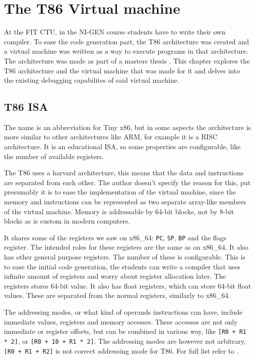 \chapter{The T86 Virtual machine}\label{section:T86}
At the FIT CTU, in the NI-GEN course students have to write their own compiler.
To ease the code generation part, the T86 architecture was created and a
virtual machine was written as a way to execute programs in that architecture.
The architecture was made as part of a masters thesis \cite{ivo2021tiny}. This
chapter explores the T86 architecture and the virtual machine that was made for
it and delves into the existing debugging capabilites of said virtual machine.

\section{T86 ISA}
The name is an abbreviation for Tiny x86, but in some aspects the architecture
is more similar to other architectures like ARM, for example it is a RISC
architecture. It is an educational ISA, so some properties are configurable,
like the number of available registers.

The T86 uses a harvard architecture, this means that the data and instructions
are separated from each other. The author doesn't specify the reason for this,
put presumably it is to ease the implementation of the virtual machine, since
the memory and instructions can be represented as two separate array-like
members of the virtual machine. Memory is addressable by 64-bit blocks, not
by 8-bit blocks as is custom in modern computers.

It shares some of the registers we saw on x86\_64: \texttt{PC}, \texttt{SP},
\texttt{BP} and the flags register. The intended roles for these registers are
the same as on x86\_64. It also has other general purpose registers. The number
of these is configurable. This is to ease the initial code generation, the students
can write a compiler that uses infinite amount of registers and worry about
register allocation later. The registers stores 64-bit value. It also has
float registers, which can store 64-bit float values. These are separated from
the normal registers, similarly to x86\_64.

The addressing modes, or what kind of operands instructions can have, include
immediate values, registers and memory accesses. These accesses are not only
immediate or register offsets, but can be combined in various way, like
\texttt{[R0 + R1 * 2]}, or \texttt{[R0 + 10 + R1 * 2]}. The addressing modes
are however not arbitrary, \texttt{[R0 + R1 + R2]} is not correct addressing
mode for T86. For full list refer to \cite{ivo2021tiny}.

